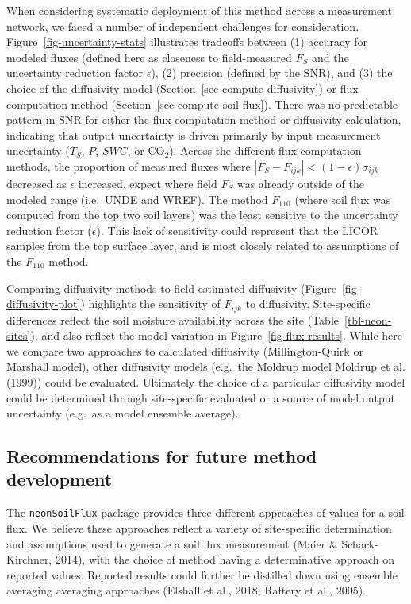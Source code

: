 \documentclass[
  letterpaper,
  DIV=11,
  numbers=noendperiod]{scrartcl}
\begin{document}
When considering systematic deployment of this method across a
measurement network, we faced a number of independent challenges for
consideration. Figure~\ref{fig-uncertainty-stats} illustrates tradeoffs
between (1) accuracy for modeled fluxes (defined here as closeness to
field-measured \(F_{S}\) and the uncertainty reduction factor
\(\epsilon\)), (2) precision (defined by the SNR), and (3) the choice of
the diffusivity model (Section~\ref{sec-compute-diffusivity}) or flux
computation method (Section~\ref{sec-compute-soil-flux}). There was no
predictable pattern in SNR for either the flux computation method or
diffusivity calculation, indicating that output uncertainty is driven
primarily by input measurement uncertainty (\(T_{S}\), \(P\), \(SWC\),
or CO\(_{2}\)). Across the different flux computation methods, the
proportion of measured fluxes where
\(| F_{S} - F_{ijk} | < (1-\epsilon) \sigma_{ijk}\) decreased as
\(\epsilon\) increased, expect where field \(F_{S}\) was already outside
of the modeled range (i.e.~UNDE and WREF). The method \(F_{110}\) (where
soil flux was computed from the top two soil layers) was the least
sensitive to the uncertainty reduction factor (\(\epsilon\)). This lack
of sensitivity could represent that the LICOR samples from the top
surface layer, and is most closely related to assumptions of the
\(F_{110}\) method.

Comparing diffusivity methods to field estimated diffusivity
(Figure~\ref{fig-diffusivity-plot}) highlights the sensitivity of
\(F_{ijk}\) to diffusivity. Site-specific differences reflect the soil
moisture availability across the site (Table~\ref{tbl-neon-sites}), and
also reflect the model variation in Figure~\ref{fig-flux-results}. While
here we compare two approaches to calculated diffusivity
(Millington-Quirk or Marshall model), other diffusivity models (e.g.~the
Moldrup model Moldrup et al. (1999)) could be evaluated. Ultimately the
choice of a particular diffusivity model could be determined through
site-specific evaluated or a source of model output uncertainty (e.g.~as
a model ensemble average).

\subsection{Recommendations for future method
development}\label{recommendations-for-future-method-development}

The \texttt{neonSoilFlux} package provides three different approaches of
values for a soil flux. We believe these approaches reflect a variety of
site-specific determination and assumptions used to generate a soil flux
measurement (Maier \& Schack-Kirchner, 2014), with the choice of method
having a determinative approach on reported values. Reported results
could further be distilled down using ensemble averaging averaging
approaches (Elshall et al., 2018; Raftery et al., 2005).
\end{document}
